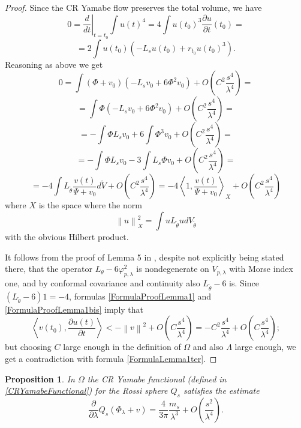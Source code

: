 \documentclass[10pt,a4paper]{amsart}
\newtheorem{proposizione}{Proposition}[section]
\renewcommand{\phi}{\varphi}
\newcommand{\de}{\partial}
\newcommand{\N}[1]{\left\lVert#1\right\rVert}
\newcommand{\bra}{\left\langle}
\newcommand{\ket}{\right\rangle}
\begin{document}
\begin{proof}
Since the CR Yamabe flow preserves the total volume, we have
$$0 = \left.\frac{d}{dt}\right|_{t=t_0}\int u(t)^4 = 4\int u(t_0)^3\frac{\de u}{\de t}(t_0)=$$
$$=2\int u(t_0)\left(-L_su(t_0) + r_{t_0}u(t_0)^3\right).$$
Reasoning as above we get
$$0= \int(\Phi+v_0)\left(-L_sv_0 + 6\Phi^2v_0\right) +O\left(C^2\frac{s^4}{\lambda^4}\right) =$$
$$= \int\Phi\left(-L_sv_0 + 6\Phi^2v_0\right) +O\left(C^2\frac{s^4}{\lambda^4}\right) =$$
$$= -\int\Phi L_sv_0 + 6\int\Phi^3v_0 +O\left(C^2\frac{s^4}{\lambda^4}\right) =$$
$$= -\int\Phi L_sv_0 -3\int L_s\Phi v_0 +O\left(C^2\frac{s^4}{\lambda^4}\right) =$$
\begin{equation}\label{FormulaProofLemma1bis}
 =-4\int L_{\widetilde{\theta}}\frac{v(t)}{\Psi+v_0}d\widetilde{V} +O\left(C^2\frac{s^4}{\lambda^4}\right)=-4\bra 1,\frac{v(t)}{\Psi+v_0}\ket_{X} +O\left(C^2\frac{s^4}{\lambda^4}\right)
\end{equation}
where $X$ is the space where the norm
$$\N{u}_X^2 = \int uL_{\widetilde{\theta}}udV_{\widetilde{\theta}}$$
with the obvious Hilbert product.

It follows from the proof of Lemma 5 in \cite{MU}, despite not explicitly being stated there, that the operator $L_{\theta}-6\phi_{p,\lambda}^2$ is nondegenerate on $V_{p,\lambda}$ with Morse index one, and by conformal covariance and continuity also $L_{\widetilde{\theta}}-6$ is. Since $(L_{\widetilde{\theta}}-6)1 = -4$, formulas \eqref{FormulaProofLemma1} and \eqref{FormulaProofLemma1bis} imply that
$$\bra v(t_0),\frac{\de u(t)}{\de t}\ket< -\N{v}^2 + O\left(C\frac{s^4}{\lambda^4}\right) = -C^2\frac{s^4}{\lambda^4} + O\left(C\frac{s^4}{\lambda^4}\right);$$
but choosing $C$ large enough in the definition of $\Omega$ and also $\Lambda$ large enough, we get a contradiction with formula \eqref{FormulaLemma1ter}.
\end{proof}


\begin{proposizione}\label{GradientEstimate}
 In $\Omega$ the CR Yamabe functional (defined in \eqref{CRYamabeFunctional}) for the Rossi sphere $Q_s$ satisfies the estimate
 $$\frac{\de}{\de\lambda}Q_s(\Phi_\lambda +v) = \frac{4}{3\pi}\frac{m_s}{\lambda^3} + O\left(\frac{s^2}{\lambda^4}\right).$$
\end{proposizione}
\end{document}
